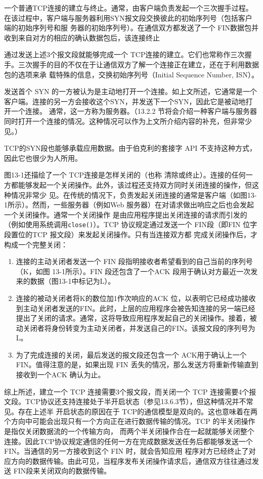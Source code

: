 一个普通TCP连接的建立与终止。通常，由客户端负责发起一个三次握手过程。在该过程中，客户端与服务器利用SYN报文段交换彼此的初始序列号（包括客户端的初始序列号和服
务器的初始序列号）。在通信双方都发送了一个 FIN数据包并收到来自对方的相应的确认数据包后，该连接终止

通过发送上述3个报文段就能够完成一个 TCP连接的建立。它们也常称作三次握手。三次握手的目的不仅在于让通信双方了解一个连接正在建立，还在于利用数据包的选项来承
载特殊的信息，交换初始序列号（Initial Sequence Number, ISN）。

发送首个 SYN 的一方被认为是主动地打开一个连接。如上文所述，它通常是一个客户端。连接的另一方会接收这个SYN，并发送下一个SYN，因此它是被动地打开一个连接。
通常，这一方称为服务器。（13.2.2 节将会介绍一种客户端与服务器同时打开一个连接的情况。这种情况可以作为上文所介绍内容的补充，但非常少见。）

\begin{tcolorbox}[title = {注意}]
    TCP的SYN段也能够承载应用数据。由于伯克利的套接字 API 不支持这种方式，因此它也很少为人所用。
\end{tcolorbox}

图13-1还描绘了一个 TCP连接是怎样关闭的（也称 清除或终止）。连接的任何一方都能够发起一个关闭操作。此外，该过程还支持双方同时关闭连接的操作，但这种情况非常少
见。在传统的情况下，负责发起关闭连接的通常是客户端（如图13-1所示）。然而，一些服务器（例如Web 服务器）在对请求做出响应之后也会发起一个关闭操作。通常一个关闭操作
是由应用程序提出关闭连接的请求而引发的（例如使用系统调用\verb|close()|）。TCP 协议规定通过发送一个 FIN段（即FIN 位字段置位的TCP 报文段）来发起关闭操作。只有当连接双方都
完成关闭操作后，才构成一个完整关闭：
\begin{enumerate}
	\item 连接的主动关闭者发送一个 FIN 段指明接收者希望看到的自己当前的序列号（K，如图 13-1所示）。FIN 段还包含了一个ACK 段用于确认对方最近一次发来的数据（图13-1中标记为L）。
	\item 连接的被动关闭者将K的数位加1作次响应的ACK 位，以表明它已经成功接收到主动关闭者发送的FIN。此时，上层的应用程序会被告知连接的另一端已经提出了关闭的请求。通常，这将导致应用程序发起自己的关闭操作。接着，被动关闭者将身份转变为主动关闭者，并发送自己的FIN。该报文段的序列号为L。
	\item 为了完成连接的关闭，最后发送的报文段还包含一个 ACK用于确认上一个FIN。值得注意的是，如果出现 FIN 丢失的情况，那么发送方将重新传输直到接收到一个ACK 确认为止。
\end{enumerate}

综上所述，建立一个 TCP 连接需要3个报文段，而关闭一个 TCP 连接需要4个报文段。TCP协议还支持连接处于半开启状态（参见13.6.3节），但这种情况并不常见。存在上述半
开启状态的原因在于 TCP的通信模型是双向的。这也意味着在两个方向中可能会出现只有一个方向正在进行数据传输的情况。TCP 的半关闭操作是指仅关闭数据流的一个传输方向，
而两个半关闭操作合在一起就能够关闭整个连接。因此TCP协议规定通信的任何一方在完成数据发送任务后都能够发送一个 FIN。当通信的另一方接收到这个 FIN 时，就会告知应用
程序对方已经终止了对应方向的数据传输。由此可见，当程序发布关闭操作请求后，通信双方往往通过发送 FIN段来关闭双向的数据传输。

